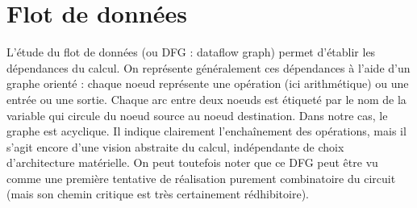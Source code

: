 \documentclass[a4paper,11pt]{exam}
\begin{document}
\section{Flot de données}
L'étude du flot de données (ou DFG : dataflow graph) permet d'établir les dépendances du calcul. On représente généralement ces dépendances à l'aide d'un graphe orienté : chaque noeud représente une opération (ici arithmétique) ou une entrée ou une sortie. Chaque arc entre deux noeuds est étiqueté par le nom de la variable qui circule du noeud source au noeud destination. Dans notre cas, le graphe est acyclique. Il indique clairement l'enchaînement des opérations, mais il s'agit encore d'une vision abstraite du calcul, indépendante de choix d'architecture matérielle. On peut toutefois noter que ce DFG peut être vu comme une première tentative de réalisation purement combinatoire du circuit (mais son chemin critique est très certainement rédhibitoire).
\end{document}
